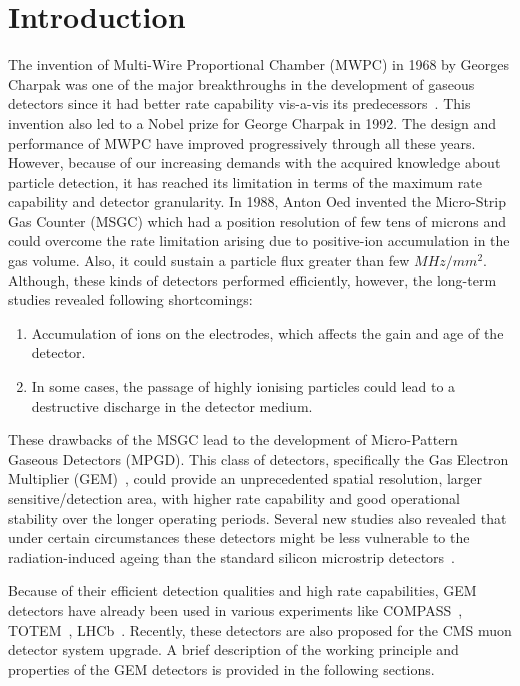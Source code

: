 \section{Introduction} %
\label{sec:introduction}
The invention of Multi-Wire Proportional Chamber (MWPC) in 1968 by Georges Charpak was one of the major breakthroughs in the development of gaseous detectors since it had better rate capability vis-a-vis its predecessors~\cite{Charpak1968}. 
This invention also led to a Nobel prize for George Charpak in 1992. 
The design and performance of MWPC have improved progressively through all these years.
However, because of our increasing demands with the acquired knowledge about particle detection, it has reached its limitation in terms of the maximum rate capability and detector granularity.
In 1988, Anton Oed invented the Micro-Strip Gas Counter (MSGC) which had a position resolution of few tens of microns and could overcome the rate limitation arising due to positive-ion accumulation in the gas volume. 
Also, it could sustain a particle flux greater than few $MHz/mm^2$. Although, these kinds of detectors performed efficiently, however, the long-term studies revealed following shortcomings:
\begin{enumerate}
	\item Accumulation of ions on the electrodes, which affects the gain and age of the detector.
	\item In some cases, the passage of highly ionising particles could lead to a destructive discharge in the detector medium.
\end{enumerate}
These drawbacks of the MSGC lead to the development of Micro-Pattern Gaseous Detectors (MPGD).
This class of detectors, specifically the Gas Electron Multiplier (GEM)~\cite{Sauli1997,Sauli1999,detector:1732870}, could provide an unprecedented spatial resolution, larger sensitive/detection area, with higher rate capability and good operational stability over the longer operating periods.
Several new studies also revealed that under certain circumstances these detectors might be less vulnerable to the radiation-induced ageing than the standard silicon microstrip detectors~\cite{TITOV2004,Titov2002}.

Because of their efficient detection qualities and high rate capabilities, GEM detectors have already been used in various experiments like COMPASS~\cite{Abbon2007}, TOTEM~\cite{Berardi2004}, LHCb~\cite{Collaboration2008}.
Recently, these detectors are also proposed for the CMS muon detector system upgrade.
A brief description of the working principle and properties of the GEM detectors is provided in the following sections.

